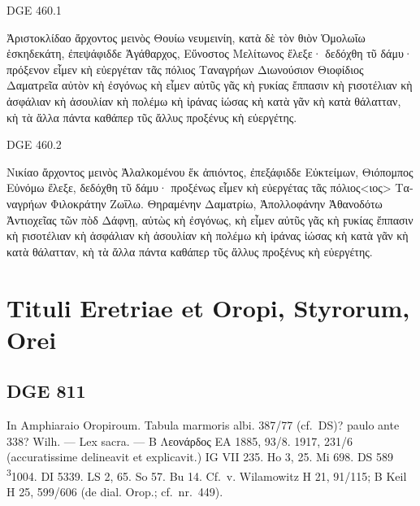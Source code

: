 \begin{versi}{DGE 460.1}
  \begin{greek}
    Ἀριστοκλίδαο ἄρχοντος μεινὸς Θουίω νευμεινίη, {\verso[1]} κατὰ δὲ τὸν
    θιὸν Ὁμολωΐω ἑσκηδεκάτη, ἐπεψάφιδδε Ἀγάθαρ{\verso}χος, Εὔνοστος
    Μελίτωνος ἔλεξε· δεδόχθη τῦ δάμυ· πρό{\verso}ξενον εἶμεν κὴ εὐεργέταν
    τᾶς πόλιος Ταναγρήων Διω{\verso}νούσιον Θιοφίδιος Δαματρεῖα αὐτὸν κὴ
    ἐσγόνως κὴ εἶμεν {\verso} αὐτῦς γᾶς κὴ ϝυκίας ἔππασιν κὴ ϝισοτέλιαν κὴ
    {\verso} ἀσφάλιαν κὴ ἀσουλίαν κὴ πολέμω κὴ ἰράνας ἰώ{\verso}σας κὴ
    κατὰ γᾶν κὴ κατὰ θάλατταν, κὴ τὰ ἄλλα {\verso} πάντα καθάπερ τῦς ἄλλυς
    προξένυς κὴ εὐεργέτης.
  \end{greek}
\end{versi}

\begin{versi}{DGE 460.2}
  \begin{greek}
    Νικίαο ἄρχοντος μεινὸς Ἀλαλκομένου ἕκ ἀπιόντος,
    {\verso[1]} ἐπεξάφιδδε Εὐκτείμων, Θιόπομπος Εὐνόμω ἔλεξε,
    δε{\verso}δόχθη τῦ δάμυ· προξένως εἶμεν κὴ εὐεργέτας τᾶς
    πόλιος{\verso}<ιος> Ταναγρήων Φιλοκράτην Ζωΐλω. Θηραμένην Δαματρίω,
    Ἀπολλοφάνην Ἀθανοδότω Ἀντιοχεῖας τῶν πὸδ Δάφνῃ, αὐτὼς {\verso} κὴ
    ἐσγόνως, κὴ εἶμεν αὐτῦς γᾶς κὴ ϝυκίας ἔππασιν κὴ {\verso} ϝισοτέλιαν κὴ
    ἀσφάλιαν κὴ ἀσουλίαν κὴ πολέμω {\verso} κὴ ἰράνας ἰώσας κὴ κατὰ γᾶν κὴ
    κατὰ θάλατταν, κὴ τὰ {\verso} ἄλλα πάντα καθάπερ τῦς ἄλλυς προξένυς κὴ
    εὐεργέτης.
  \end{greek}
\end{versi}

\section{Tituli Eretriae et Oropi, Styrorum, Orei}

\subsection{DGE 811}
In Amphiaraio Oropiroum. Tabula marmoris albi. 387/77 (cf.\ DS)? paulo ante
338? Wilh. — Lex sacra. — \textgreek{Β Λεονάρδος} EA 1885, 93/8. 1917,
231/6 (accuratissime delineavit et explicavit.) IG VII 235. Ho 3, 25.
Mi 698. DS 589 \textsuperscript{3}1004. DI 5339. LS 2, 65. So 57. Bu 14.
Cf.\ v. Wilamowitz H 21, 91/115; B Keil H 25, 599/606
(de dial. Orop.; cf.\ nr.\ 449).

